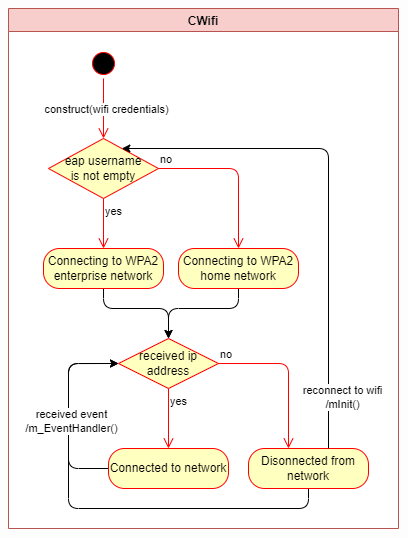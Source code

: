 \begin{figure}[H]
  \centering
  \includegraphics[width=.45\columnwidth]{uml/wifi-state-diagram.png}
\end{figure}